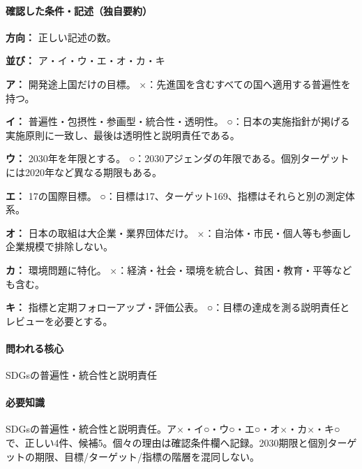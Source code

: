 \paragraph{確認した条件・記述（独自要約）}\mbox{}\par

\noindent\textbf{方向：} 正しい記述の数。\par

\noindent\textbf{並び：} ア・イ・ウ・エ・オ・カ・キ\par

\noindent\textbf{ア：} 開発途上国だけの目標。 ×：先進国を含むすべての国へ適用する普遍性を持つ。\par

\noindent\textbf{イ：} 普遍性・包摂性・参画型・統合性・透明性。 ○：日本の実施指針が掲げる実施原則に一致し、最後は透明性と説明責任である。\par

\noindent\textbf{ウ：} 2030年を年限とする。 ○：2030アジェンダの年限である。個別ターゲットには2020年など異なる期限もある。\par

\noindent\textbf{エ：} 17の国際目標。 ○：目標は17、ターゲット169、指標はそれらと別の測定体系。\par

\noindent\textbf{オ：} 日本の取組は大企業・業界団体だけ。 ×：自治体・市民・個人等も参画し企業規模で排除しない。\par

\noindent\textbf{カ：} 環境問題に特化。 ×：経済・社会・環境を統合し、貧困・教育・平等なども含む。\par

\noindent\textbf{キ：} 指標と定期フォローアップ・評価公表。 ○：目標の達成を測る説明責任とレビューを必要とする。\par

\paragraph{問われる核心} SDGsの普遍性・統合性と説明責任

\paragraph{必要知識} SDGsの普遍性・統合性と説明責任。ア×・イ○・ウ○・エ○・オ×・カ×・キ○で、正しい4件、候補5。個々の理由は確認条件欄へ記録。2030期限と個別ターゲットの期限、目標/ターゲット/指標の階層を混同しない。

